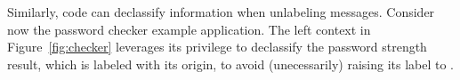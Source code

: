Similarly, code can declassify information when unlabeling messages.
%
Consider now the password checker example application. The left
context in Figure~\ref{fig:checker} leverages its 
privilege to declassify the password strength result, which is labeled
with its origin, to avoid (unecessarily) raising its label to
.
%







%
%


